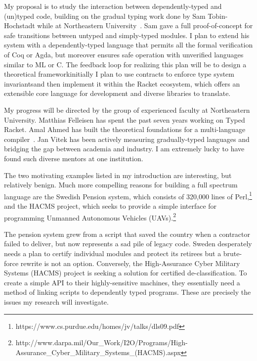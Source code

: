 \documentclass[12pt]{article}
\newcommand{\hdr}[2]{\vspace{-0.4cm}{\flushleft{\hrulefill\\\textbf{#1}\hfill{#2}\\\vspace{-0.2cm}\hrulefill}}\vspace{0.1cm}}
\begin{document}
My proposal is to study the interaction between dependently-typed and (un)typed code, building on the gradual typing work done by Sam Tobin-Hochstadt while at Northeastern University~\cite{tobin2010typed}.
Sam gave a full proof-of-concept for safe transitions between untyped and simply-typed modules.
I plan to extend his system with a dependently-typed language that permits all the formal verification of Coq or Agda, but moreover ensures safe operation with unverified languages similar to ML or C.
The feedback loop for realizing this plan will be to design a theoretical framework\textemdash initially I plan to use contracts to enforce type system invariants\textemdash and then implement it within the Racket ecosystem, which offers an extensible core language for development and diverse libraries to translate.

My progress will be directed by the group of experienced faculty at Northeastern University.
Matthias Felleisen has spent the past seven years working on Typed Racket.
Amal Ahmed has built the theoretical foundations for a multi-language compiler~\cite{perconti2014verifying}.
Jan Vitek has been actively measuring gradually-typed languages and bridging the gap between academia and industry.
I am extremely lucky to have found such diverse mentors at one institution.

\newpage

\hdr{Broader Impacts}{}

The two motivating examples listed in my introduction are interesting, but relatively benign.
Much more compelling reasons for building a full spectrum language are the Swedish Pension system, which consists of 320,000 lines of Perl,\footnote{https://www.cs.purdue.edu/homes/jv/talks/dls09.pdf} and the HACMS project, which seeks to provide a simple interface for programming Unmanned Autonomous Vehicles (UAVs).\footnote{http://www.darpa.mil/Our\_Work/I2O/Programs/High-Assurance\_Cyber\_Military\_Systems\_(HACMS).aspx}

The pension system grew from a script that saved the country when a contractor failed to deliver, but now represents a sad pile of legacy code.
Sweden desperately needs a plan to certify individual modules and protect its retirees but a brute-force rewrite is not an option.
Conversely, the High-Assurance Cyber Military Systems (HACMS) project is seeking a solution for certified de-classification.
To create a simple API to their highly-sensitive machines, they essentially need a method of linking scripts to dependently typed programs.
These are precisely the issues my research will investigate.
\end{document}

